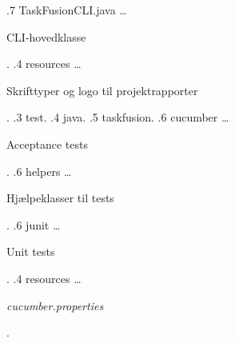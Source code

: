 \begin{figure}[H]
{        .7 TaskFusionCLI.java \ldots{} \begin{minipage}[t]{8cm} CLI-hovedklasse \end{minipage}.
        .4 resources \ldots{} \begin{minipage}[t]{10cm} Skrifttyper og logo til projektrapporter \end{minipage}.
        .3 test.
        .4 java.
        .5 taskfusion.
        .6 cucumber \ldots{} \begin{minipage}[t]{5cm} Acceptance tests \end{minipage}.
        .6 helpers \ldots{} \begin{minipage}[t]{5cm} Hjælpeklasser til tests \end{minipage}.
        .6 junit \ldots{} \begin{minipage}[t]{5cm} Unit tests \end{minipage}.
        .4 resources \ldots{} \begin{minipage}[t]{5cm} \emph{cucumber.properties} \end{minipage}.
    }
\end{figure}